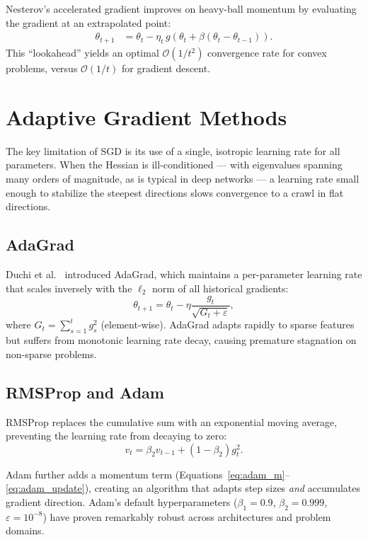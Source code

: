 \documentclass[11pt,twoside,openright]{book}
\begin{document}
Nesterov's accelerated gradient \cite{nesterov1983} improves on heavy-ball momentum by
evaluating the gradient at an extrapolated point:
\begin{align}
  \theta_{t+1} &= \theta_t - \eta_t\, g(\theta_t + \beta(\theta_t - \theta_{t-1})).
\end{align}
This ``lookahead'' yields an optimal $\mathcal{O}(1/t^2)$ convergence rate for convex problems,
versus $\mathcal{O}(1/t)$ for gradient descent.

\section{Adaptive Gradient Methods}

The key limitation of SGD is its use of a single, isotropic learning rate for all parameters.
When the Hessian is ill-conditioned — with eigenvalues spanning many orders of magnitude, as is
typical in deep networks — a learning rate small enough to stabilize the steepest directions
slows convergence to a crawl in flat directions.

\subsection{AdaGrad}

Duchi et al.\ \cite{duchi2011} introduced AdaGrad, which maintains a per-parameter learning
rate that scales inversely with the $\ell_2$ norm of all historical gradients:
\begin{equation}
  \theta_{t+1} = \theta_t - \eta \frac{g_t}{\sqrt{G_t + \varepsilon}},
\end{equation}
where $G_t = \sum_{s=1}^{t} g_s^2$ (element-wise). AdaGrad adapts rapidly to sparse features
but suffers from monotonic learning rate decay, causing premature stagnation on non-sparse
problems.

\subsection{RMSProp and Adam}

RMSProp \cite{tieleman2012} replaces the cumulative sum with an exponential moving average,
preventing the learning rate from decaying to zero:
\begin{equation}
  v_t = \beta_2 v_{t-1} + (1-\beta_2) g_t^2.
\end{equation}

Adam \cite{kingma2015} further adds a momentum term (Equations~\ref{eq:adam_m}--\ref{eq:adam_update}),
creating an algorithm that adapts step sizes \emph{and} accumulates gradient direction. Adam's
default hyperparameters ($\beta_1=0.9$, $\beta_2=0.999$, $\varepsilon=10^{-8}$) have proven
remarkably robust across architectures and problem domains.
\end{document}
